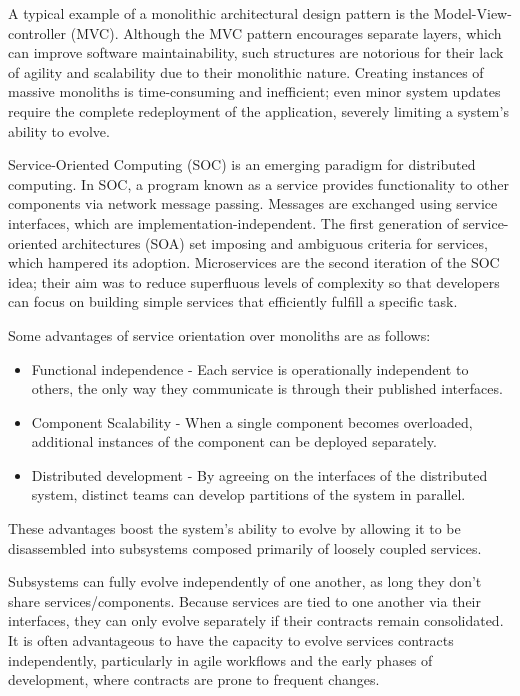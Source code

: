 A typical example of a monolithic architectural design pattern is the Model-View-controller (MVC).
Although the MVC pattern encourages separate layers, which can improve software maintainability,
such structures are notorious for their lack of agility and scalability due to their monolithic nature.
Creating instances of massive monoliths is time-consuming and inefficient;
even minor system updates require the complete redeployment of the application, severely limiting a system's ability to evolve.

Service-Oriented Computing (SOC) is an emerging paradigm for distributed computing.
In SOC, a program known as a service provides functionality to other components via network message passing.
Messages are exchanged using service interfaces, which are implementation-independent.
The first generation of service-oriented architectures (SOA) set imposing and ambiguous criteria for services, which hampered its adoption.
Microservices are the second iteration of the SOC idea;
their aim was to reduce superfluous levels of complexity so that developers can focus on building simple services that efficiently fulfill a specific task.

Some advantages of service orientation over monoliths are as follows:
\begin{itemize}
    \item Functional independence - Each service is operationally independent to others, the only way they communicate is through their published interfaces.
    \item Component Scalability - When a single component becomes overloaded, additional instances of the component can be deployed separately.
    \item Distributed development - By agreeing on the interfaces of the distributed system, distinct teams can develop partitions of the system in parallel.
\end{itemize}

These advantages boost the system's ability to evolve by allowing it to be disassembled into subsystems composed primarily of loosely coupled services.

Subsystems can fully evolve independently of one another, as long they don't share services/components.
Because services are tied to one another via their interfaces, they can only evolve separately if their contracts remain consolidated.
It is often advantageous to have the capacity to evolve services contracts independently,
particularly in agile workflows and the early phases of development, where contracts are prone to frequent changes.

